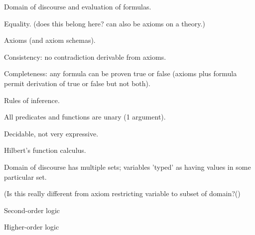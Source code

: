 \label{sec:First_order_model}

Domain of discourse and evaluation of formulas.

Equality.
(does this belong here? can also be axioms on a theory.)

\label{sec:First_order_theory}

Axioms (and axiom schemas).~\cite{wiki:List_of_first_order_theories}

Consistency: no contradiction derivable from axioms.

Completeness: any formula can be proven 
\textsf{true} or \textsf{false} 
(axioms plus formula permit derivation of 
\textsf{true} or \textsf{false} but not both).

\label{sec:First_order_deductive_systems}

Rules of inference.

\label{sec:Monadic_first_order_logic}

All predicates and functions are unary 
(1 argument).~\cite{wiki:Monadic_predicate_calculus}

Decidable, not very expressive.

\label{sec:Many_sorted_first_order_models}

Hilbert's function calculus.~\cite{sep:logic_firstorder_emergence}

Domain of discourse has multiple sets;
variables 'typed' as having values in some particular 
set.~\cite{sep:modeltheory_fo}

(Is this really different from
axiom restricting variable to subset of domain?()


\label{sec:Second_order_logic}

Second-order logic~\cite{wiki:Second_order_logic,
wiki:Second_order_propositional_logic}

\label{sec:Higher_order_logic}

Higher-order logic~\cite{wiki:Higher_order_logic}


\setcounter{currentlevel}{\value{baseSectionLevel}}
\label{sec:Constructivism}

